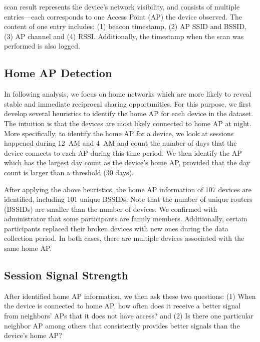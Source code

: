 \wifi{} scan result represents the device's network visibility, and consists of
multiple entries---each corresponds to one \wifi{} Access Point (AP) the device
observed. The content of one entry includes: (1) beacon timestamp, (2) AP SSID
and BSSID, (3) AP channel and (4) RSSI. Additionally, the timestamp when the
scan was performed is also logged.

\subsection{Home AP Detection}
\label{subsec:homeap}

In following analysis, we focus on home \wifi{} networks which are more likely
to reveal stable and immediate reciprocal sharing opportunities. For this
purpose, we first develop several heuristics to identify the home AP for each
device in the dataset. The intuition is that the devices are most likely
connected to home AP at night. More specifically, to identify the home AP for a
device, we look at \wifi{} sessions happened during 12~AM and 4~AM and count the
number of days that the device connects to each AP during this time period. We
then identify the AP which has the largest day count as the device's home AP,
provided that the day count is larger than a threshold (30 days).

After applying the above heuristics, the home AP information of 107 devices are
identified, including 101 unique BSSIDs. Note that the number of unique routers
(BSSIDs) are smaller than the number of devices. We confirmed with \PhoneLab{}
administrator that some \PhoneLab{} participants are family members.
Additionally, certain participants replaced their broken devices with new ones
during  the data collection period. In both cases, there are multiple devices
associated with the same home AP.

\subsection{\wifi{} Session Signal Strength}
\label{subsec:better}

After identified home AP information, we then ask these two questions: (1) When
the device is connected to home AP, how often does it receive a better signal
from neighbors' APs that it does not have access? and (2) Is there one
particular neighbor AP among others that consistently provides better signals
than the device's home AP?

